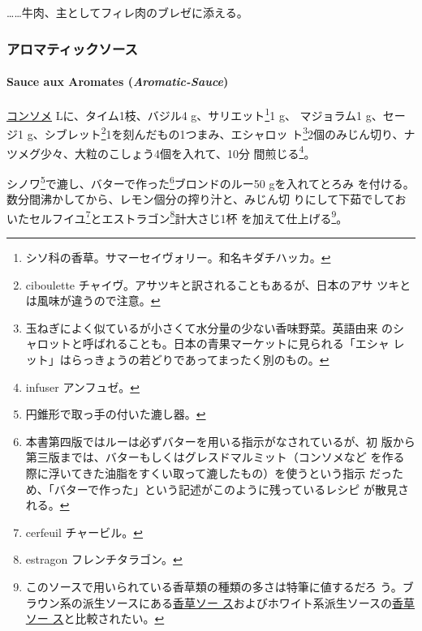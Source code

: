 \begin{recette}
\ldots{}\ldots{}牛肉、主としてフィレ肉のブレゼに添える。

\maeaki

\hypertarget{ux30a2ux30edux30deux30c6ux30a3ux30c3ux30afux30bdux30fcux30b9}{%
\subsubsection{アロマティックソース}\label{ux30a2ux30edux30deux30c6ux30a3ux30c3ux30afux30bdux30fcux30b9}}

\hypertarget{aromatic-sauce}{%
\paragraph{\texorpdfstring{Sauce aux Aromates
(\emph{Aromatic-Sauce})}{Sauce aux Aromates (Aromatic-Sauce)}}\label{aromatic-sauce}}

 
 

\protect\hyperlink{}{コンソメ}\undemi{} Lに、タイム1枝、バジル4
g、サリエット\footnote{シソ科の香草。サマーセイヴォリー。和名キダチハッカ。}1
g、 マジョラム1 g、セージ1 g、シブレット\footnote{ciboulette
  チャイヴ。アサツキと訳されることもあるが、日本のアサ
  ツキとは風味が違うので注意。}1を刻んだもの1つまみ、エシャロッ
ト\footnote{玉ねぎによく似ているが小さくて水分量の少ない香味野菜。英語由来
  のシャロットと呼ばれることも。日本の青果マーケットに見られる「エシャ
  レット」はらっきょうの若どりであってまったく別のもの。}2個のみじん切り、ナツメグ少々、大粒のこしょう4個を入れて、10分
間煎じる\footnote{infuser アンフュゼ。}。

シノワ\footnote{円錐形で取っ手の付いた漉し器。}で漉し、バターで作った\footnote{本書第四版ではルーは必ずバターを用いる指示がなされているが、初
  版から第三版までは、バターもしくはグレスドマルミット（コンソメなど
  を作る際に浮いてきた油脂をすくい取って漉したもの）を使うという指示
  だっため、「バターで作った」という記述がこのように残っているレシピ
  が散見される。}ブロンドのルー50 gを入れてとろみ
を付ける。数分間沸かしてから、レモン\undemi{}個分の搾り汁と、みじん切
りにして下茹でしておいたセルフイユ\footnote{cerfeuil チャービル。}とエストラゴン\footnote{estragon
  フレンチタラゴン。}計大さじ1杯 を加えて仕上げる\footnote{このソースで用いられている香草類の種類の多さは特筆に値するだろ
  う。ブラウン系の派生ソースにある\protect\hyperlink{sauce-aux-fines-herbes}{香草ソー
  ス}およびホワイト系派生ソースの\protect\hyperlink{sauce-aux-fines-herbes-blanche}{香草ソー
  ス}と比較されたい。}。


\end{recette}
